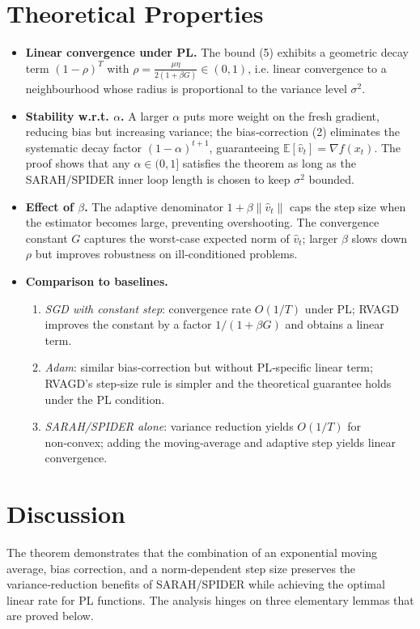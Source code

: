 \documentclass[11pt]{article}
\newcommand{\E}{\mathbb{E}}
\newcommand{\grad}{\nabla}
\begin{document}
\section*{Theoretical Properties}
\begin{itemize}
\item \textbf{Linear convergence under PL.}  The bound (5) exhibits a geometric decay term $ (1-\rho)^T$ with $\rho=\frac{\mu\eta}{2(1+\beta G)}\in(0,1)$, i.e. linear convergence to a neighbourhood whose radius is proportional to the variance level $\sigma^2$.
\item \textbf{Stability w.r.t. $\alpha$.}  A larger $\alpha$ puts more weight on the fresh gradient, reducing bias but increasing variance; the bias‑correction (2) eliminates the systematic decay factor $(1-\alpha)^{t+1}$, guaranteeing $\E[\hat v_t]=\grad f(x_t)$.  The proof shows that any $\alpha\in(0,1]$ satisfies the theorem as long as the SARAH/SPIDER inner loop length is chosen to keep $\sigma^2$ bounded.
\item \textbf{Effect of $\beta$.}  The adaptive denominator $1+\beta\|\hat v_t\|$ caps the step size when the estimator becomes large, preventing overshooting.  The convergence constant $G$ captures the worst‑case expected norm of $\hat v_t$; larger $\beta$ slows down $\rho$ but improves robustness on ill‑conditioned problems.
\item \textbf{Comparison to baselines.}
    \begin{enumerate}[label=(\alph*)]
        \item \textit{SGD with constant step}: convergence rate $O(1/T)$ under PL; RVAGD improves the constant by a factor $1/(1+\beta G)$ and obtains a linear term.
        \item \textit{Adam}: similar bias‑correction but without PL‑specific linear term; RVAGD’s step‑size rule is simpler and the theoretical guarantee holds under the PL condition.
        \item \textit{SARAH/SPIDER alone}: variance reduction yields $O(1/T)$ for non‑convex; adding the moving‑average and adaptive step yields linear convergence.
    \end{enumerate}
\end{itemize}

\section*{Discussion}
The theorem demonstrates that the combination of an exponential moving average, bias correction, and a norm‑dependent step size preserves the variance‑reduction benefits of SARAH/SPIDER while achieving the optimal linear rate for PL functions.  The analysis hinges on three elementary lemmas that are proved below.
\end{document}
